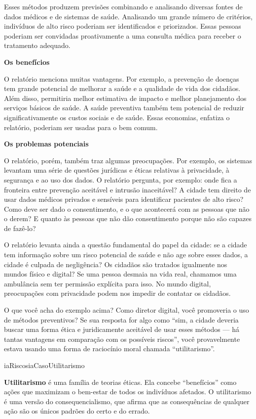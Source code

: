 \documentclass[
  11pt,
]{article}
\newenvironment{definicao}[1][Definicao]{\begin{iabox}{iaRiscos}{iaCaso}{#1}}{\end{iabox}}
\begin{document}
Esses métodos produzem previsões combinando e analisando diversas fontes
de dados médicos e de sistemas de saúde. Analisando um grande número de
critérios, indivíduos de alto risco poderiam ser identificados e
priorizados. Essas pessoas poderiam ser convidadas proativamente a uma
consulta médica para receber o tratamento adequado.

\textbf{Os benefícios}

O relatório menciona muitas vantagens. Por exemplo, a prevenção de
doenças tem grande potencial de melhorar a saúde e a qualidade de vida
dos cidadãos. Além disso, permitiria melhor estimativa de impacto e
melhor planejamento dos serviços básicos de saúde. A saúde preventiva
também tem potencial de reduzir significativamente os custos sociais e
de saúde. Essas economias, enfatiza o relatório, poderiam ser usadas
para o bem comum.

\textbf{Os problemas potenciais}

O relatório, porém, também traz algumas preocupações. Por exemplo, os
sistemas levantam uma série de questões jurídicas e éticas relativas à
privacidade, à segurança e ao uso dos dados. O relatório pergunta, por
exemplo: onde fica a fronteira entre prevenção aceitável e intrusão
inaceitável? A cidade tem direito de usar dados médicos privados e
sensíveis para identificar pacientes de alto risco? Como deve ser dado o
consentimento, e o que acontecerá com as pessoas que não o derem? E
quanto às pessoas que não dão consentimento porque não são capazes de
fazê-lo?

O relatório levanta ainda a questão fundamental do papel da cidade: se a
cidade tem informação sobre um risco potencial de saúde e não age sobre
esses dados, a cidade é culpada de negligência? Os cidadãos são tratados
igualmente nos mundos físico e digital? Se uma pessoa desmaia na vida
real, chamamos uma ambulância sem ter permissão explícita para isso. No
mundo digital, preocupações com privacidade podem nos impedir de
contatar os cidadãos.

O que você acha do exemplo acima? Como diretor digital, você promoveria
o uso de métodos preventivos? Se sua resposta for algo como ``sim, a
cidade deveria buscar uma forma ética e juridicamente aceitável de usar
esses métodos --- há tantas vantagens em comparação com os possíveis
riscos'', você provavelmente estava usando uma forma de raciocínio moral
chamada ``utilitarismo''.

\begin{definicao}[Utilitarismo]

\textbf{Utilitarismo} é uma família de teorias éticas. Ela concebe
``benefícios'' como ações que maximizam o bem-estar de todos os
indivíduos afetados. O utilitarismo é uma versão do consequencialismo,
que afirma que as consequências de qualquer ação são os únicos padrões
do certo e do errado.

\end{definicao}
\end{document}
